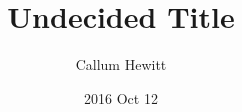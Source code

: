 \documentclass{UoYCSproject}{}
\title{Undecided Title}
\author{Callum Hewitt}
\date{2016 Oct 12}
\begin{document}
\maketitle
\listoffigures
\listoftables






{}
\end{document}
